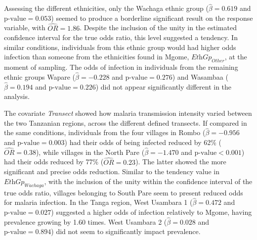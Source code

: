 Assessing the different ethnicities, only the Wachaga ethnic group ($\widehat{\beta}=0.619$ and $\text{p-value}=0.053$) seemed to produce a borderline significant result on the response variable, with $\widehat{OR}=1.86$.
Despite the inclusion of the unity in the estimated confidence interval for the true odds ratio, this level suggested a tendency.
In similar conditions, individuals from this ethnic group would had higher odds infection than someone from the ethnicities found in Mgome, $\textit{EthGp}_{Other}$, at the moment of sampling.
The odds of infection in individuals from the remaining ethnic groups Wapare ($\widehat{\beta}=-0.228$ and $\text{p-value}=0.276$) and Wasambaa ($\widehat{\beta}=0.194$ and $\text{p-value}=0.226$) did not appear significantly different in the analysis.

The covariate \textit{Transect} showed how malaria transmission intensity varied between the two Tanzanian regions, across the different defined transects.
If compared in the same conditions, individuals from the four villages in Rombo ($\widehat{\beta}=-0.956$ and $\text{p-value}=0.003$) had their odds of being infected reduced by 62\% ($\widehat{OR}=0.38$), while villages in the North Pare ($\widehat{\beta}=-1.470$ and $\text{p-value}<0.001$) had their odds reduced by 77\% ($\widehat{OR}=0.23$).
The latter showed the more significant and precise odds reduction.
Similar to the tendency value in $\textit{EthGp}_{Wachaga}$, with the inclusion of the unity within the confidence interval of the true odds ratio, villages belonging to South Pare seem to present reduced odds for malaria infection.
In the Tanga region, West Usambara 1 ($\widehat{\beta}=0.472$ and $\text{p-value}=0.027$) suggested a higher odds of infection relatively to Mgome, having prevalence growing by 1.60 times.
West Usambara 2 ($\widehat{\beta}=0.028$ and $\text{p-value}=0.894$) did not seem to significantly impact prevalence.

